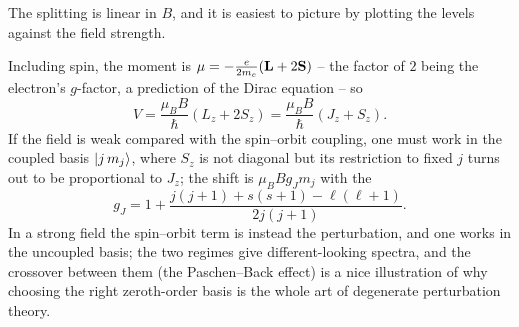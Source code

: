 \documentclass[a4paper]{scrartcl}
\begin{document}
The splitting is linear in $B$, and it is easiest to picture by plotting the levels against the field strength.

\begin{center}
\end{center}

\begin{remark}
    Including spin, the moment is $\mathbf{\mu} = -\frac{e}{2m_e}(\mathbf{L} + 2\mathbf{S})$ -- the factor of $2$ being the electron's $g$-factor, a prediction of the Dirac equation -- so
    $$
    V = \frac{\mu_B B}{\hbar}\left( L_z + 2S_z \right) = \frac{\mu_B B}{\hbar}\left( J_z + S_z \right).
    $$
    If the field is weak compared with the spin--orbit coupling, one must work in the coupled basis $\ket{j\,m_j}$, where $S_z$ is not diagonal but its restriction to fixed $j$ turns out to be proportional to $J_z$; the shift is $\mu_B B g_J m_j$ with the 
    $$
    g_J = 1 + \frac{j(j+1)+s(s+1)-\ell(\ell+1)}{2j(j+1)}.
    $$
    In a strong field the spin--orbit term is instead the perturbation, and one works in the uncoupled basis; the two regimes give different-looking spectra, and the crossover between them (the Paschen--Back effect) is a nice illustration of why choosing the right zeroth-order basis is the whole art of degenerate perturbation theory.
\end{remark}
\end{document}
